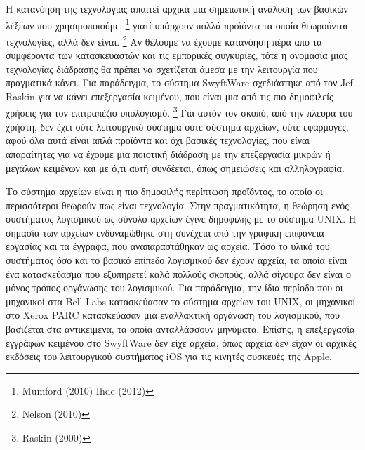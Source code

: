 \documentclass[
]{article}
\begin{document}
Η κατανόηση της τεχνολογίας απαιτεί αρχικά μια σημειωτική ανάλυση των
βασικών λέξεων που χρησιμοποιούμε, \footnote{Mumford (2010) Ihde (2012)}
γιατί υπάρχουν πολλά προϊόντα τα οποία θεωρούνται τεχνολογίες, αλλά δεν
είναι. \footnote{Nelson (2010)} Αν θέλουμε να έχουμε κατανόηση πέρα από
τα συμφέροντα των κατασκευαστών και τις εμπορικές συγκυρίες, τότε η
ονομασία μιας τεχνολογίας διάδρασης θα πρέπει να σχετίζεται άμεσα με την
λειτουργία που πραγματικά κάνει. Για παράδειγμα, το σύστημα SwyftWare
σχεδιάστηκε από τον Jef Raskin για να κάνει επεξεργασία κειμένου, που
είναι μια από τις πιο δημοφιλείς χρήσεις για τον επιτραπέζιο υπολογισμό.
\footnote{Raskin (2000)} Για αυτόν τον σκοπό, από την πλευρά του χρήστη,
δεν έχει ούτε λειτουργικό σύστημα ούτε σύστημα αρχείων, ούτε εφαρμογές,
αφού όλα αυτά είναι απλά προϊόντα και όχι βασικές τεχνολογίες, που είναι
απαραίτητες για να έχουμε μια ποιοτική διάδραση με την επεξεργασία
μικρών ή μεγάλων κειμένων και με ό,τι αυτή συνδέεται, όπως σημειώσεις
και αλληλογραφία.

Το σύστημα αρχείων είναι η πιο δημοφιλής περίπτωση προϊόντος, το οποίο
οι περισσότεροι θεωρούν πως είναι τεχνολογία. Στην πραγματικότητα, η
θεώρηση ενός συστήματος λογισμικού ως σύνολο αρχείων έγινε δημοφιλής με
το σύστημα UNIX. Η σημασία των αρχείων ενδυναμώθηκε στη συνέχεια από την
γραφική επιφάνεια εργασίας και τα έγγραφα, που αναπαραστάθηκαν ως
αρχεία. Τόσο το υλικό του συστήματος όσο και το βασικό επίπεδο
λογισμικού δεν έχουν αρχεία, τα οποία είναι ένα κατασκεύασμα που
εξυπηρετεί καλά πολλούς σκοπούς, αλλά σίγουρα δεν είναι ο μόνος τρόπος
οργάνωσης του λογισμικού. Για παράδειγμα, την ίδια περίοδο που οι
μηχανικοί στα Bell Labs κατασκεύασαν το σύστημα αρχείων του UNIX, οι
μηχανικοί στο Xerox PARC κατασκεύασαν μια εναλλακτική οργάνωση του
λογισμικού, που βασίζεται στα αντικείμενα, τα οποία ανταλλάσσουν
μηνύματα. Επίσης, η επεξεργασία εγγράφων κειμένου στο SwyftWare δεν είχε
αρχεία, όπως αρχεία δεν είχαν οι αρχικές εκδόσεις του λειτουργικού
συστήματος iOS για τις κινητές συσκευές της Apple.
\end{document}
